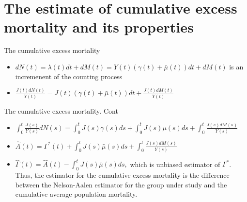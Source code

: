 \documentclass{beamer}
\begin{document}
\section{The estimate of cumulative excess mortality and its properties}
  \begin{frame}{The cumulative excess mortality}
 \begin{itemize} 
   \item $dN(t) = \lambda(t)dt + dM(t) = Y(t) (\gamma(t) + \bar\mu(t)) dt + dM(t)$ is an incremenent of the counting process
   \newline
   \item $\frac{J(t) dN(t)}{Y(t)} = J(t)(\gamma(t) + \bar\mu(t)) dt + \frac{J(t)dM(t)}{Y(t)}$
   \end{itemize}
\end{frame} 
   
   \begin{frame}{The cumulative excess mortality. Cont}
   \begin{itemize} 
   \item $\int_0^t \frac{J(s)}{Y(s)}dN(s) = \int_0^t J(s)\gamma(s) ds + \int_0^t J(s)\bar\mu(s)ds + \int_0^t \frac{J(s)dM(s)}{Y(s)}$
   \newline
   \item $\hat A(t) = \Gamma^*(t) + \int_0^t J(s)\bar\mu(s)ds + \int_0^t \frac{J(s)dM(s)}{Y(s)}$ 
    \item $\hat\Gamma(t) = \hat A(t) - \int_0^t J(s) \bar\mu(s) ds,$
   \newline
   which is unbiased estimator of $\Gamma^*$.
  \newline
  \newline
   Thus, the estimator for the cumulative excess mortality is the difference between the Nelson-Aalen estimator for the group under study and the cumulative average population mortality.
   \end{itemize}
\end{frame}
\end{document}
